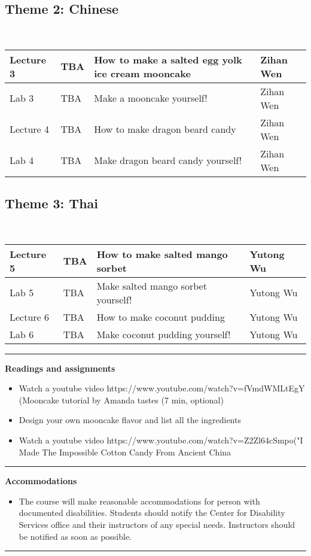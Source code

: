 \documentclass{article}
\begin{document}
\subsection*{Theme 2: Chinese }\\
\vspace{0.5em} \begin{tabular}{|l|l|l|l|}
\hline 
Lecture 3 & TBA & How to make a salted egg yolk ice cream mooncake & Zihan Wen\\
\hline
Lab 3 & TBA & Make a mooncake yourself!& Zihan Wen\\
\hline
Lecture 4 & TBA & How to make dragon beard candy & Zihan Wen\\
\hline 
Lab 4 & TBA & Make dragon beard candy yourself!& Zihan Wen\\
\hline
\end{tabular}


 \subsection*{Theme 3: Thai }\\
 \vspace{0.5em} \begin{tabular}{|l|l|l|l|}
\hline 
Lecture 5 & TBA & How to make salted mango sorbet
 & Yutong Wu\\
\hline
Lab 5 & TBA & Make salted mango sorbet yourself!& Yutong Wu\\
\hline
Lecture 6 & TBA & How to make coconut pudding & Yutong Wu\\
\hline 
Lab 6 & TBA & Make coconut pudding yourself!& Yutong Wu\\
\hline
\end{tabular}




\vspace{1em}
\par\noindent\rule{\textwidth}{0.4pt}
  
\noindent\textbf{Readings and assignments}
\begin{itemize}
\item Watch a youtube video https://www.youtube.com/watch?v=fVmdWMLtEgY (Mooncake tutorial by Amanda tastes (7 min, optional)
\item Design your own mooncake flavor and list all the ingredients 
\item Watch a youtube video https://www.youtube.com/watch?v=Z2Zl64cSmpo("I Made The Impossible Cotton Candy From Ancient China 
\end{itemize}
  \par\noindent\rule{\textwidth}{0.4pt}
\textbf{Accommodations }
\begin{itemize}
\vspace{0.5em} 
\item\noindent The course will make reasonable accommodations for person with documented disabilities. Students should notify the Center for Disability Services office and their instructors of any special needs. Instructors should be notified as soon as possible.

 \end{itemize}
  \par\noindent\rule{\textwidth}{0.4pt}
\end{document}
